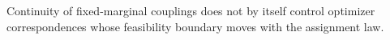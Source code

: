 Continuity of fixed-marginal couplings does not by itself control optimizer correspondences whose feasibility boundary moves with the assignment law.